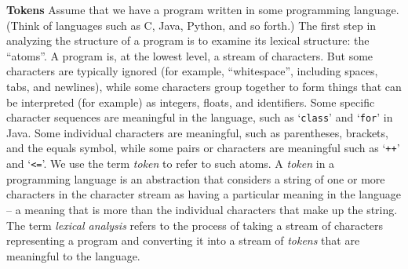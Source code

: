 \begin{minipage}[t]{\sw}
\slidenumber
\LARGE
{\bf Tokens}\exx
Assume that we have a program written in some programming language.
(Think of languages such as C, Java, Python, and so forth.)
The first step in analyzing the structure of a program
is to examine its lexical structure: the ``atoms''.\exx
A program is, at the lowest level, a stream of characters.
But some characters are typically ignored
(for example, ``whitespace'', including spaces, tabs, and newlines),
while some characters group together to form things
that can be interpreted (for example) as integers, floats, and identifiers.
Some specific character sequences are meaningful in the language,
such as `\verb'class'' and `\verb'for'' in Java.
Some individual characters are meaningful,
such as parentheses, brackets, and the equals symbol,
while some pairs or characters are meaningful
such as `\verb'++'' and `\verb'<=''.
We use the term {\em token} to refer to such atoms.\exx
A {\em token} in a programming language is an abstraction
that considers a string of one or more characters in the character stream
as having a particular meaning in the language --
a meaning that is more than the individual characters
that make up the string.
The term {\em lexical analysis} refers
to the process of taking a stream of characters representing a program
and converting it into a stream of {\em tokens}
that are meaningful to the language.
\end{minipage}
\clearpage
